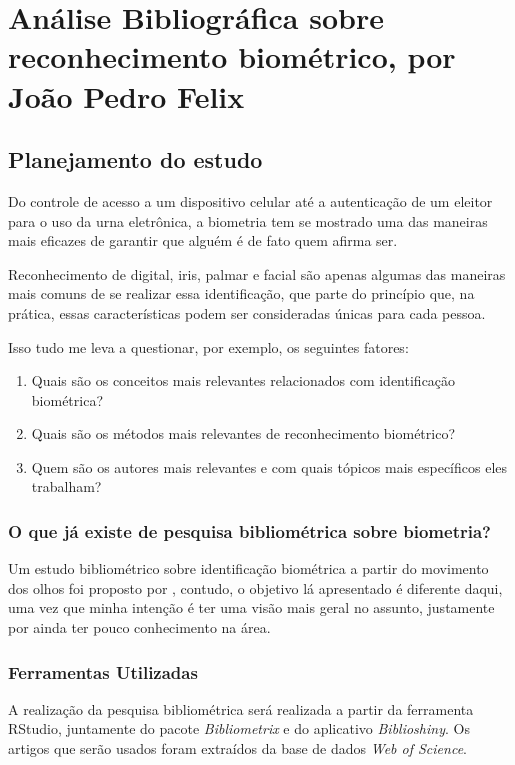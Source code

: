 \chapter{Análise Bibliográfica sobre reconhecimento biométrico, por João Pedro Felix}

\section{Planejamento do estudo}
Do controle de acesso a um dispositivo celular até a autenticação de um eleitor para o uso da urna eletrônica, a biometria tem se mostrado uma das maneiras mais eficazes de garantir que alguém é de fato quem afirma ser.

Reconhecimento de digital, iris, palmar e facial são apenas algumas das maneiras mais comuns de se realizar essa identificação, que parte do princípio que, na prática, essas características podem ser consideradas únicas para cada pessoa.

Isso tudo me leva a questionar, por exemplo, os seguintes fatores:

\begin{enumerate}
    \item Quais são os conceitos mais relevantes relacionados com identificação biométrica?
    \item Quais são os métodos mais relevantes de reconhecimento biométrico?
    \item Quem são os autores mais relevantes e com quais tópicos mais específicos eles trabalham?
\end{enumerate}

\subsection{O que já existe de pesquisa bibliométrica sobre biometria?}

Um estudo bibliométrico sobre identificação biométrica a partir do movimento dos olhos foi proposto por \citet{brasil_eye_2020}, contudo, o objetivo lá apresentado é diferente daqui, uma vez que minha intenção é ter uma visão mais geral no assunto, justamente por ainda ter pouco conhecimento na área.

\subsection{Ferramentas Utilizadas}

A realização da pesquisa bibliométrica será realizada a partir da ferramenta RStudio, juntamente do pacote \textit{Bibliometrix} e do aplicativo \textit{Biblioshiny}. Os artigos que serão usados foram extraídos da base de dados \textit{Web of Science}.


